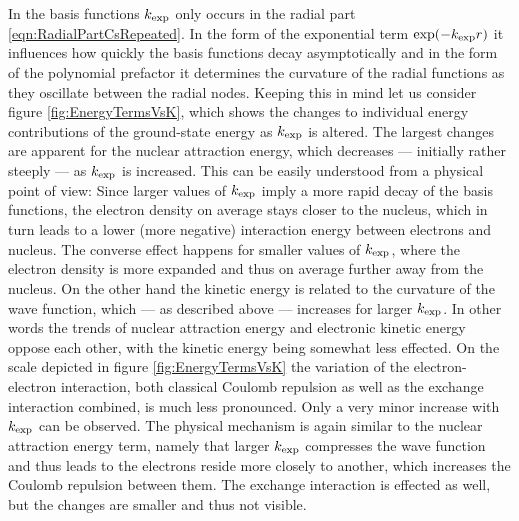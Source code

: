 In the \CS basis functions
$k_\text{exp}$ only occurs in the radial part \eqref{eqn:RadialPartCsRepeated}.
In the form of the exponential term $\exp(-k_\text{exp} r)$
it influences how quickly the basis functions decay asymptotically
and in the form of the polynomial prefactor it determines
the curvature of the radial functions as they oscillate between the radial nodes.
Keeping this in mind let us consider figure \vref{fig:EnergyTermsVsK},
which shows the changes to individual energy contributions
of the \HF ground-state energy as $k_\text{exp}$ is altered.
The largest changes are apparent for the nuclear attraction energy,
which decreases --- initially rather steeply --- as $k_\text{exp}$ is increased.
This can be easily understood from a physical point of view:
Since larger values of $k_\text{exp}$ imply a more rapid decay
of the basis functions,
the electron density on average stays closer to the nucleus,
which in turn leads to a lower (more negative) interaction energy
between electrons and nucleus.
The converse effect happens for smaller values of $k_\text{exp}$,
where the electron density is more expanded
and thus on average further away from the nucleus.
On the other hand the kinetic energy is related to the curvature of the wave function,
which --- as described above --- increases for larger $k_\text{exp}$.
In other words the trends of nuclear attraction energy and electronic kinetic energy
oppose each other,
with the kinetic energy being somewhat less effected.
On the scale depicted in figure \ref{fig:EnergyTermsVsK}
the variation of the electron-electron interaction,
\ie both classical Coulomb repulsion as well as the exchange interaction combined,
is much less pronounced.
Only a very minor increase with $k_\text{exp}$ can be observed.
The physical mechanism is again similar to the nuclear attraction
energy term,
namely that larger $k_\text{exp}$ compresses the wave function
and thus leads to the electrons reside more closely to another,
which increases the Coulomb repulsion between them.
The exchange interaction is effected as well,
but the changes are smaller and thus not visible.

